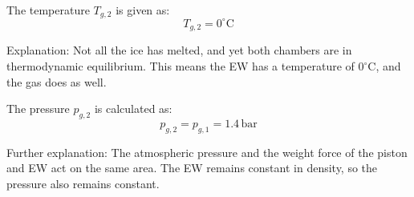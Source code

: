 The temperature \( T_{g,2} \) is given as:  
\[
T_{g,2} = 0^\circ\text{C}
\]  

Explanation: Not all the ice has melted, and yet both chambers are in thermodynamic equilibrium. This means the EW has a temperature of \( 0^\circ\text{C} \), and the gas does as well.  

The pressure \( p_{g,2} \) is calculated as:  
\[
p_{g,2} = p_{g,1} = 1.4 \, \text{bar}
\]  

Further explanation: The atmospheric pressure and the weight force of the piston and EW act on the same area. The EW remains constant in density, so the pressure also remains constant.